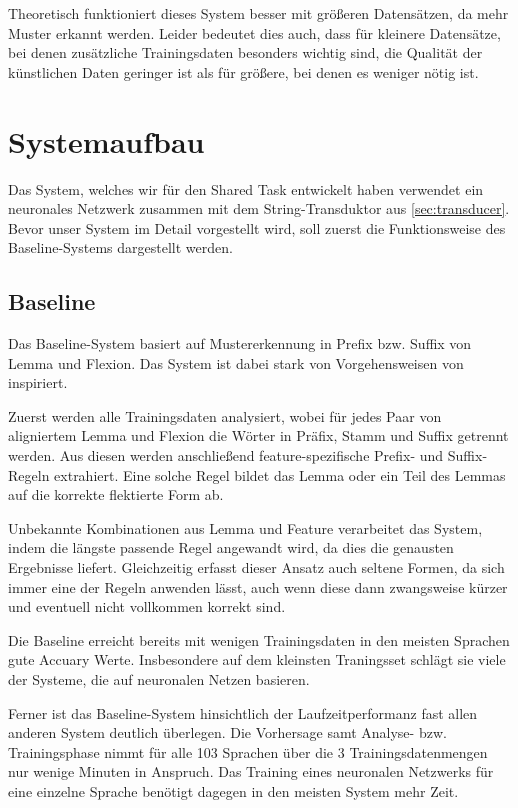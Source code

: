 \documentclass[a4paper]{article}
\begin{document}
Theoretisch funktioniert dieses System besser mit größeren Datensätzen, da mehr Muster erkannt werden. Leider bedeutet dies auch, dass für kleinere Datensätze, bei denen zusätzliche Trainingsdaten besonders wichtig sind, die Qualität der künstlichen Daten geringer ist als für größere, bei denen es weniger nötig ist.

\section{Systemaufbau}
\label{sec:architecture}
Das System, welches wir für den Shared Task entwickelt haben verwendet ein neuronales Netzwerk zusammen mit dem String-Transduktor aus \autoref{sec:transducer}. Bevor unser System im Detail vorgestellt wird, soll zuerst die Funktionsweise des Baseline-Systems dargestellt werden.

\subsection{Baseline}
\label{sec:baseline}
Das Baseline-System basiert auf Mustererkennung in Prefix bzw. Suffix von Lemma und Flexion. Das System ist dabei stark von Vorgehensweisen von \cite{baseline:Ling2016} inspiriert.

Zuerst werden alle Trainingsdaten analysiert, wobei für jedes Paar von aligniertem Lemma und Flexion die Wörter in Präfix, Stamm und Suffix getrennt werden. Aus diesen werden anschließend feature-spezifische Prefix- und Suffix-Regeln extrahiert. Eine solche Regel bildet das Lemma oder ein Teil des Lemmas auf die korrekte flektierte Form ab.

Unbekannte Kombinationen aus Lemma und Feature verarbeitet das System, indem die längste passende Regel angewandt wird, da dies die genausten Ergebnisse liefert. Gleichzeitig erfasst dieser Ansatz auch seltene Formen, da sich immer eine der Regeln anwenden lässt, auch wenn diese dann zwangsweise kürzer und eventuell nicht vollkommen korrekt sind.

Die Baseline erreicht bereits mit wenigen Trainingsdaten in den meisten Sprachen gute Accuary Werte. Insbesondere auf dem kleinsten Traningsset schlägt sie viele der Systeme, die auf neuronalen Netzen basieren.

Ferner ist das Baseline-System hinsichtlich der Laufzeitperformanz fast allen anderen System deutlich überlegen. Die  Vorhersage samt Analyse- bzw. Trainingsphase nimmt für alle 103 Sprachen über die 3 Trainingsdatenmengen nur wenige Minuten in Anspruch. Das Training eines neuronalen Netzwerks für eine einzelne Sprache benötigt dagegen in den meisten System mehr Zeit.
\end{document}
